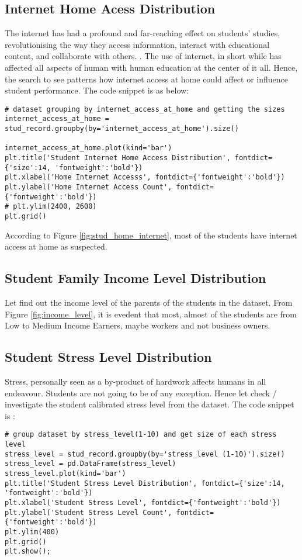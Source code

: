 \subsection{Internet Home Acess Distribution}
The internet has had a profound and far-reaching effect on students' studies, revolutionising the way they access
information, interact with educational content, and collaborate with others. \cite{article}. The use of internet, in short while has affected all aspects of human with human education at the center of it all. Hence, the search to see patterns how internet access at home could affect or influence student performance. 
The code snippet is as below: 
\begin{verbatim}
# dataset grouping by internet_access_at_home and getting the sizes
internet_access_at_home = stud_record.groupby(by='internet_access_at_home').size()

internet_access_at_home.plot(kind='bar')
plt.title('Student Internet Home Access Distribution', fontdict={'size':14, 'fontweight':'bold'})
plt.xlabel('Home Internet Accesss', fontdict={'fontweight':'bold'})
plt.ylabel('Home Internet Access Count', fontdict={'fontweight':'bold'})
# plt.ylim(2400, 2600)
plt.grid()
\end{verbatim}

According to Figure \ref{fig:stud_home_internet}, most of the students have internet access at home as suspected. 

\subsection{Student Family Income Level Distribution}
Let find out the income level of the parents of the students in the dataset. From Figure \ref{fig:income_level}, it is evedent that most, almost of the students are from Low to Medium Income Earners, maybe workers and not business owners. 


\subsection{Student Stress Level Distribution}
Stress, personally seen as a by-product of hardwork affects humans in all endeavour. Students are not going to be of any exception. Hence let check / investigate the student calibrated stress level from the dataset. The code snippet is : 

\begin{verbatim}
# group dataset by stress_level(1-10) and get size of each stress level
stress_level = stud_record.groupby(by='stress_level (1-10)').size()
stress_level = pd.DataFrame(stress_level) 
stress_level.plot(kind='bar')
plt.title('Student Stress Level Distribution', fontdict={'size':14, 'fontweight':'bold'})
plt.xlabel('Student Stress Level', fontdict={'fontweight':'bold'})
plt.ylabel('Student Stress Level Count', fontdict={'fontweight':'bold'})
plt.ylim(400)
plt.grid()
plt.show();
\end{verbatim}

